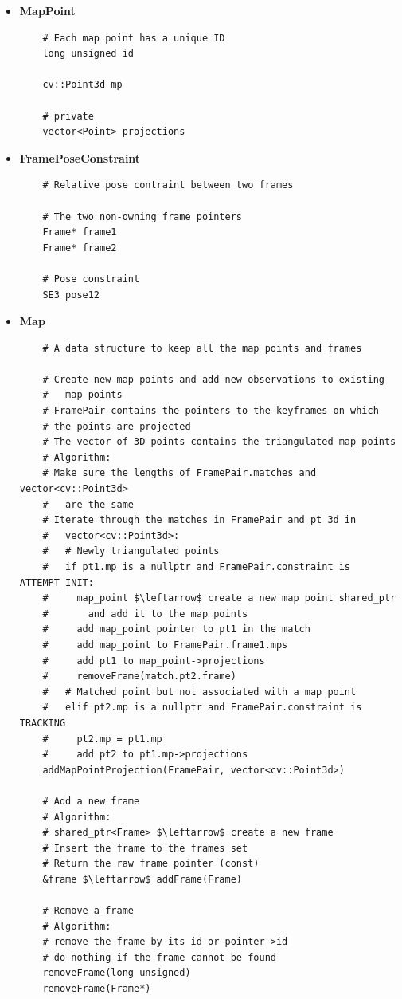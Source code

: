 \begin{itemize}
  \item \textbf{MapPoint}
  \begin{verbatim}
    # Each map point has a unique ID
    long unsigned id

    cv::Point3d mp

    # private
    vector<Point> projections
  \end{verbatim}

  \item \textbf{FramePoseConstraint}
  \begin{lstlisting}
    # Relative pose contraint between two frames
    
    # The two non-owning frame pointers
    Frame* frame1 
    Frame* frame2

    # Pose constraint
    SE3 pose12

  \end{lstlisting}

  \item \textbf{Map}
  \begin{lstlisting}
    # A data structure to keep all the map points and frames

    # Create new map points and add new observations to existing
    #   map points
    # FramePair contains the pointers to the keyframes on which 
    # the points are projected
    # The vector of 3D points contains the triangulated map points
    # Algorithm:
    # Make sure the lengths of FramePair.matches and vector<cv::Point3d>
    #   are the same
    # Iterate through the matches in FramePair and pt_3d in 
    #   vector<cv::Point3d>:
    #   # Newly triangulated points
    #   if pt1.mp is a nullptr and FramePair.constraint is ATTEMPT_INIT:
    #     map_point $\leftarrow$ create a new map point shared_ptr 
    #       and add it to the map_points
    #     add map_point pointer to pt1 in the match
    #     add map_point to FramePair.frame1.mps
    #     add pt1 to map_point->projections
    #     removeFrame(match.pt2.frame)
    #   # Matched point but not associated with a map point
    #   elif pt2.mp is a nullptr and FramePair.constraint is TRACKING
    #     pt2.mp = pt1.mp 
    #     add pt2 to pt1.mp->projections
    addMapPointProjection(FramePair, vector<cv::Point3d>)

    # Add a new frame
    # Algorithm:
    # shared_ptr<Frame> $\leftarrow$ create a new frame
    # Insert the frame to the frames set
    # Return the raw frame pointer (const)
    &frame $\leftarrow$ addFrame(Frame)

    # Remove a frame
    # Algorithm:
    # remove the frame by its id or pointer->id
    # do nothing if the frame cannot be found
    removeFrame(long unsigned)
    removeFrame(Frame*)


\end{lstlisting}
\end{itemize}
